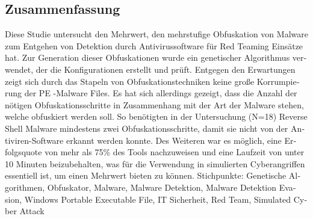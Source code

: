 \begin{otherlanguage}{ngerman}
	\chapter*{Zusammenfassung}
    Diese Studie untersucht den Mehrwert, den mehrstufige Obfuskation von Malware zum Entgehen von Detektion durch Antivirussoftware für Red Teaming Einsätze hat. Zur Generation dieser Obfuskationen wurde ein genetischer Algorithmus verwendet, der die Konfigurationen erstellt und prüft. Entgegen den Erwartungen zeigt sich durch das Stapeln von Obfuskationstechniken keine große Korrumpierung der PE -Malware Files. Es hat sich allerdings gezeigt, dass die Anzahl der nötigen Obfuskationsschritte in Zusammenhang mit der Art der Malware stehen, welche obfuskiert werden soll. So benötigten in der Untersuchung (N=18) Reverse Shell Malware mindestens zwei Obfuskationsschritte, damit sie nicht von der Antiviren-Software erkannt werden konnte. 
    Des Weiteren war es möglich, eine Erfolgsquote von mehr als 75\% des Tools nachzuweisen und eine Laufzeit von unter 10 Minuten beizubehalten, was für die Verwendung in simulierten Cyberangriffen essentiell ist, um einen Mehrwert bieten zu können.
    Stichpunkte: Genetische Algorithmen, Obfuskator, Malware, Malware Detektion, Malware Detektion Evasion, Windows Portable Executable File, IT Sicherheit, Red Team, Simulated Cyber Attack
\end{otherlanguage}
